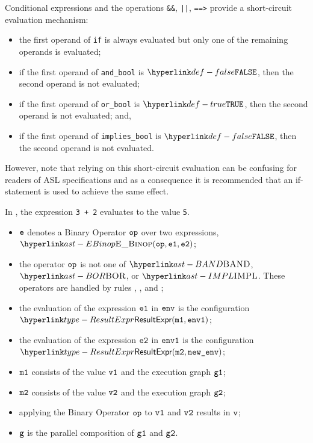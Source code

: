 
Conditional expressions and the operations \texttt{\&\&}, \texttt{||},
\texttt{==>} provide a short-circuit evaluation mechanism:

\begin{itemize}
\item the first operand of \texttt{if} is always evaluated but only one of the
remaining operands is evaluated;
\item if the first operand of \texttt{and\_bool} is $\False$, then the second operand is not evaluated;
\item if the first operand of \texttt{or\_bool} is $\True$, then the second operand is not evaluated; and,
\item if the first operand of \texttt{implies\_bool} is $\False$, then the
second operand is not evaluated.
\end{itemize}

However, note that relying on this short-circuit evaluation can be confusing
for readers of ASL specifications and as a consequence it is recommended that
an if-statement is used to achieve the same effect.

In ,
the expression \texttt{3 + 2} evaluates to the value \texttt{5}.

\ProseParagraph
\AllApply
\begin{itemize}
  \item $\texttt{e}$ denotes a Binary Operator $\texttt{op}$ over two expressions, $\EBinop(\op, \veone, \vetwo)$;
  \item the operator $\texttt{op}$ is not one of $\BAND$, $\BOR$, or $\IMPL$.
        These operators are handled by rules
        ,
        , and
        ;
  \item the evaluation of the expression $\texttt{e1}$ in $\texttt{env}$ is the configuration \\
        $\ResultExpr(\vmone, \envone)$\ProseOrAbnormal;
  \item the evaluation of the expression $\texttt{e2}$ in $\texttt{env1}$ is the configuration \\
        $\ResultExpr(\vmtwo, \newenv)$\ProseOrAbnormal;
  \item $\texttt{m1}$ consists of the value $\texttt{v1}$ and the execution graph $\texttt{g1}$;
  \item $\texttt{m2}$ consists of the value $\texttt{v2}$ and the execution graph $\texttt{g2}$;
  \item applying the Binary Operator $\texttt{op}$ to $\texttt{v1}$ and $\texttt{v2}$ results in $\texttt{v}$\ProseOrError;
  \item $\texttt{g}$ is the parallel composition of $\texttt{g1}$ and $\texttt{g2}$.
\end{itemize}

